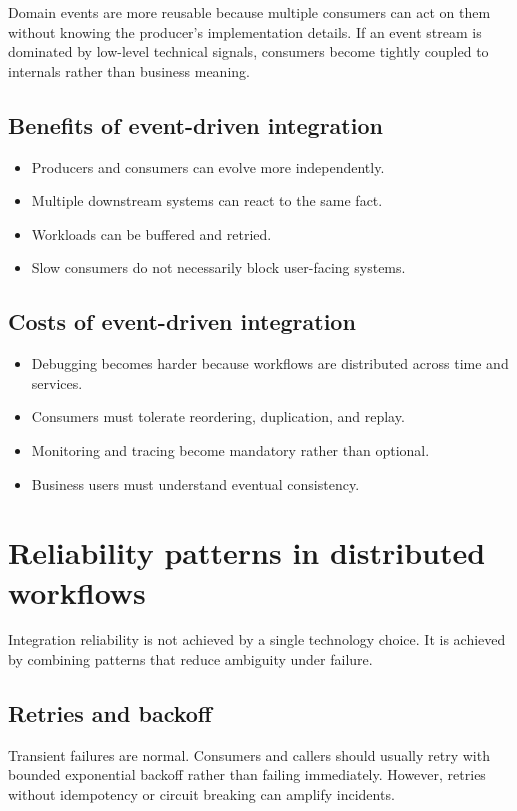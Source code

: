 Domain events are more reusable because multiple consumers can act on them without knowing the producer's implementation details.
If an event stream is dominated by low-level technical signals, consumers become tightly coupled to internals rather than business meaning.

\subsection{Benefits of event-driven integration}
\begin{itemize}
  \item Producers and consumers can evolve more independently.
  \item Multiple downstream systems can react to the same fact.
  \item Workloads can be buffered and retried.
  \item Slow consumers do not necessarily block user-facing systems.
\end{itemize}

\subsection{Costs of event-driven integration}
\begin{itemize}
  \item Debugging becomes harder because workflows are distributed across time and services.
  \item Consumers must tolerate reordering, duplication, and replay.
  \item Monitoring and tracing become mandatory rather than optional.
  \item Business users must understand eventual consistency.
\end{itemize}

\section{Reliability patterns in distributed workflows}
Integration reliability is not achieved by a single technology choice.
It is achieved by combining patterns that reduce ambiguity under failure.

\subsection{Retries and backoff}
Transient failures are normal.
Consumers and callers should usually retry with bounded exponential backoff rather than failing immediately.
However, retries without idempotency or circuit breaking can amplify incidents.

